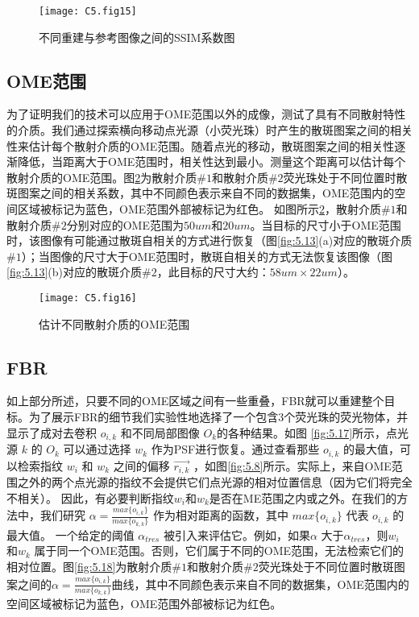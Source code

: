 \begin{figure}[htp]
	\centering
	\texttt{[image: C5.fig15]}
	\caption{不同重建与参考图像之间的SSIM系数图}
	\label{fig:5.15}
\end{figure}

\subsection{OME范围}

为了证明我们的技术可以应用于OME范围以外的成像，测试了具有不同散射特性的介质。我们通过探索横向移动点光源（小荧光珠）时产生的散斑图案之间的相关性来估计每个散射介质的OME范围。随着点光的移动，散斑图案之间的相关性逐渐降低，当距离大于OME范围时，相关性达到最小。测量这个距离可以估计每个散射介质的OME范围。图\ref{fig:5.16}为散射介质$\# 1$和散射介质$\# 2$荧光珠处于不同位置时散斑图案之间的相关系数，其中不同颜色表示来自不同的数据集，OME范围内的空间区域被标记为蓝色，OME范围外部被标记为红色。
如图所示\ref{fig:5.16}，散射介质$\# 1$和散射介质$\# 2$分别对应的OME范围为$50 um$和$20 um$。当目标的尺寸小于OME范围时，该图像有可能通过散斑自相关的方式进行恢复（图\ref{fig:5.13}(a)对应的散斑介质$\# 1$）；当图像的尺寸大于OME范围时，散斑自相关的方式无法恢复该图像（图\ref{fig:5.13}(b)对应的散斑介质$\# 2$，此目标的尺寸大约：$ 58 um \times 22 um $）。

\begin{figure}[htp]
	\centering
	\texttt{[image: C5.fig16]}
	\caption{估计不同散射介质的OME范围}
	\label{fig:5.16}
\end{figure}

\subsection{FBR}

如上部分所述，只要不同的OME区域之间有一些重叠，FBR就可以重建整个目标。为了展示FBR的细节我们实验性地选择了一个包含3个荧光珠的荧光物体，并显示了成对去卷积 $o_{i,k}$ 和不同局部图像 $O_{k}$的各种结果。如图 \ref{fig:5.17}所示，点光源 $k$ 的 $O_{k}$ 可以通过选择 $w_{k}$ 作为PSF进行恢复。通过查看那些 $o_{i,k}$ 的最大值，可以检索指纹 $w_{i}$ 和 $w_{k}$ 之间的偏移 $\vec{r_{i,k}}$ ，如图\ref{fig:5.8}所示。实际上，来自OME范围之外的两个点光源的指纹不会提供它们点光源的相对位置信息（因为它们将完全不相关）。
因此，有必要判断指纹$w_{i}$和$w_{k}$是否在ME范围之内或之外。在我们的方法中，我们研究 $\alpha= \frac {max\{o_{i,k}\}} {max\{o_{k,k}\}}$ 作为相对距离的函数，其中 $max \{ o_{i,k} \}$ 代表 $o_{i,k}$ 的最大值。
一个给定的阈值 $\alpha_{tres}$ 被引入来评估它。例如，如果$\alpha$ 大于$\alpha_{tres}$，则$w_{i}$ 和$w_{k}$ 属于同一个OME范围。否则，它们属于不同的OME范围，无法检索它们的相对位置。图\ref{fig:5.18}为散射介质$\# 1$和散射介质$\# 2$荧光珠处于不同位置时散斑图案之间的$\alpha= \frac {max\{o_{i,k}\}} {max\{o_{k,k}\}}$曲线，其中不同颜色表示来自不同的数据集，OME范围内的空间区域被标记为蓝色，OME范围外部被标记为红色。

